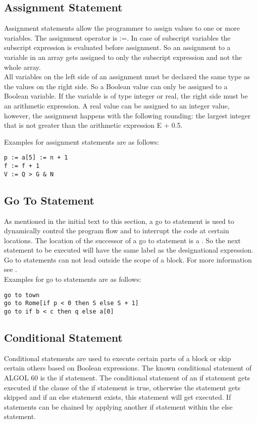 \documentclass{article}
\begin{document}
\subsection{Assignment Statement} \label{assigStat}
Assignment statements allow the programmer to assign values to one or more variables. The assignment operator is :=. In case of subscript variables the subscript expression is evaluated before assignment. So an assignment to a variable in an array gets assigned to only the subscript expression and not the whole array. \\
All variables on the left side of an assignment must be declared the same type as the values on the right side. So a Boolean value can only be assigned to a Boolean variable. If the variable is of type integer or real, the right side must be an arithmetic expression. A real value can be assigned to an integer value, however, the assignment happens with the following rounding: the largest integer that is not greater than the arithmetic expression E + 0.5.

Examples for assignment statements are as follows:\\ 
\begin{lstlisting}[language={[60]algol}]
p := a[5] := n + 1
f := f + 1
V := Q > G & N
\end{lstlisting}

\subsection{Go To Statement}
As mentioned in the initial text to this section, a go to statement is used to dynamically control the program flow and to interrupt the code at certain locations. The location of the successor of a go to statement is a . So the next statement to be executed will have the same label as the designational expression.\\
Go to statements can not lead outside the scope of a block. For more information see .\\

Examples for go to statements are as follows:\\ 
\begin{lstlisting}[language={[60]algol}]
go to town
go to Rome[if p < 0 then S else S + 1]
go to if b < c then q else a[0]
\end{lstlisting}

\subsection{Conditional Statement}
Conditional statements are used to execute certain parts of a block or skip certain others based on Boolean expressions. The known conditional statement of ALGOL 60 is the if statement. The conditional statement of an if statement gets executed if the clause of the if statement is true, otherwise the statement gets skipped and if an else statement exists, this statement will get executed. If statements can be chained by applying another if statement within the else statement.\\
\end{document}
